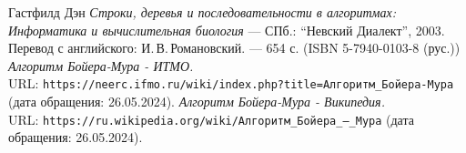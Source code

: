 \begin{thebibliography}{99}
    Гастфилд Дэн
    {\itshape Строки, деревья и последовательности в алгоритмах: Информатика и вычислительная биология} --- СПб.: \enquote{Невский Диалект}, 2003. Перевод с английского: И.\,В.\,Романовский. --- 654 с. (ISBN 5-7940-0103-8 (рус.))
    {\itshape Алгоритм Бойера-Мура - ИТМО.} \\URL: \texttt{https://neerc.ifmo.ru/wiki/index.php?title=Алгоритм\_Бойера-Мура} (дата обращения: 26.05.2024).
    {\itshape Алгоритм Бойера-Мура - Википедия.} \\URL: \texttt{https://ru.wikipedia.org/wiki/Алгоритм\_Бойера\_—\_Мура} (дата обращения: 26.05.2024).
    \end{thebibliography}
    \pagebreak
    
    
    